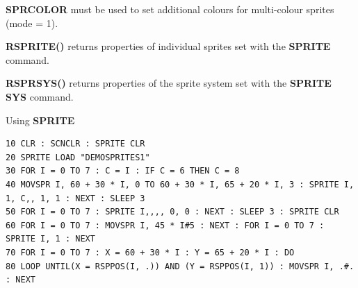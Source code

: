 \begin{description}[leftmargin=2cm,style=nextline]
\item [Remarks:]  {\bf SPRCOLOR} must be used to set additional colours for multi-colour sprites (mode = 1).

                  {\bf RSPRITE()} returns properties of individual sprites set with the {\bf SPRITE} command.

                  {\bf RSPRSYS()} returns properties of the sprite system set with the {\bf SPRITE SYS} command.

\item [Example:]  Using {\bf SPRITE}

\begin{tcolorbox}[colback=black,coltext=white]
\verbatimfont{\codefont}
\begin{verbatim}
10 CLR : SCNCLR : SPRITE CLR
20 SPRITE LOAD "DEMOSPRITES1"
30 FOR I = 0 TO 7 : C = I : IF C = 6 THEN C = 8
40 MOVSPR I, 60 + 30 * I, 0 TO 60 + 30 * I, 65 + 20 * I, 3 : SPRITE I, 1, C,, 1, 1 : NEXT : SLEEP 3
50 FOR I = 0 TO 7 : SPRITE I,,,, 0, 0 : NEXT : SLEEP 3 : SPRITE CLR
60 FOR I = 0 TO 7 : MOVSPR I, 45 * I#5 : NEXT : FOR I = 0 TO 7 : SPRITE I, 1 : NEXT
70 FOR I = 0 TO 7 : X = 60 + 30 * I : Y = 65 + 20 * I : DO
80 LOOP UNTIL(X = RSPPOS(I, .)) AND (Y = RSPPOS(I, 1)) : MOVSPR I, .#. : NEXT
\end{verbatim}
\end{tcolorbox}
\end{description}


\newpage
